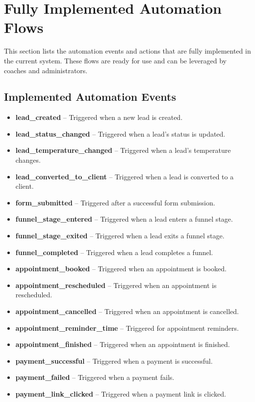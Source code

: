 \documentclass[12pt,a4paper]{article}
\begin{document}
\section{Fully Implemented Automation Flows}
This section lists the automation events and actions that are fully implemented in the current system. These flows are ready for use and can be leveraged by coaches and administrators.

\subsection*{Implemented Automation Events}
\begin{itemize}[leftmargin=2em]
    \item \textbf{lead\_created} -- Triggered when a new lead is created.
    \item \textbf{lead\_status\_changed} -- Triggered when a lead's status is updated.
    \item \textbf{lead\_temperature\_changed} -- Triggered when a lead's temperature changes.
    \item \textbf{lead\_converted\_to\_client} -- Triggered when a lead is converted to a client.
    \item \textbf{form\_submitted} -- Triggered after a successful form submission.
    \item \textbf{funnel\_stage\_entered} -- Triggered when a lead enters a funnel stage.
    \item \textbf{funnel\_stage\_exited} -- Triggered when a lead exits a funnel stage.
    \item \textbf{funnel\_completed} -- Triggered when a lead completes a funnel.
    \item \textbf{appointment\_booked} -- Triggered when an appointment is booked.
    \item \textbf{appointment\_rescheduled} -- Triggered when an appointment is rescheduled.
    \item \textbf{appointment\_cancelled} -- Triggered when an appointment is cancelled.
    \item \textbf{appointment\_reminder\_time} -- Triggered for appointment reminders.
    \item \textbf{appointment\_finished} -- Triggered when an appointment is finished.
    \item \textbf{payment\_successful} -- Triggered when a payment is successful.
    \item \textbf{payment\_failed} -- Triggered when a payment fails.
    \item \textbf{payment\_link\_clicked} -- Triggered when a payment link is clicked.

\end{itemize}
\end{document}
